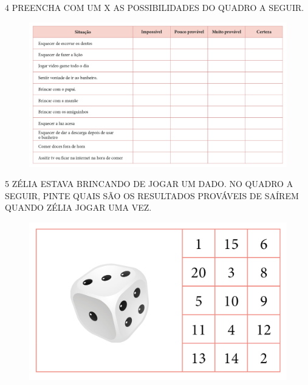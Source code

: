 \pagebreak
\num{4} PREENCHA COM UM X AS POSSIBILIDADES DO QUADRO A SEGUIR.

\begin{figure}[htpb!]
\includegraphics[width=\textwidth]{../ilustracoes/MAT1/SAEB_1ANO_MAT_FIGURA87.png}
\end{figure}


\num{5} ZÉLIA ESTAVA BRINCANDO DE JOGAR UM DADO. NO QUADRO A SEGUIR, PINTE QUAIS SÃO
OS RESULTADOS PROVÁVEIS DE SAÍREM QUANDO ZÉLIA JOGAR UMA VEZ.

\begin{figure}[htpb!]
\centering
\includegraphics[width=.7\textwidth]{../ilustracoes/MAT1/SAEB_1ANO_MAT_FIGURA88.png}
\end{figure}


